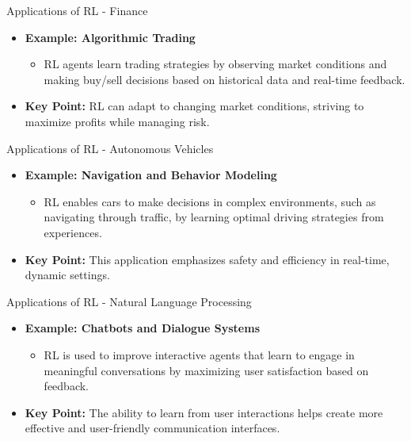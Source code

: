 \documentclass[aspectratio=169]{beamer}
\begin{document}
\begin{frame}{Applications of RL - Finance}
    \begin{itemize}
        \item \textbf{Example: Algorithmic Trading}
            \begin{itemize}
                \item RL agents learn trading strategies by observing market conditions and making buy/sell decisions based on historical data and real-time feedback.
            \end{itemize}
        \item \textbf{Key Point:} RL can adapt to changing market conditions, striving to maximize profits while managing risk.
    \end{itemize}
\end{frame}

\begin{frame}{Applications of RL - Autonomous Vehicles}
    \begin{itemize}
        \item \textbf{Example: Navigation and Behavior Modeling}
            \begin{itemize}
                \item RL enables cars to make decisions in complex environments, such as navigating through traffic, by learning optimal driving strategies from experiences.
            \end{itemize}
        \item \textbf{Key Point:} This application emphasizes safety and efficiency in real-time, dynamic settings.
    \end{itemize}
\end{frame}

\begin{frame}{Applications of RL - Natural Language Processing}
    \begin{itemize}
        \item \textbf{Example: Chatbots and Dialogue Systems}
            \begin{itemize}
                \item RL is used to improve interactive agents that learn to engage in meaningful conversations by maximizing user satisfaction based on feedback.
            \end{itemize}
        \item \textbf{Key Point:} The ability to learn from user interactions helps create more effective and user-friendly communication interfaces.
    \end{itemize}
\end{frame}
\end{document}
